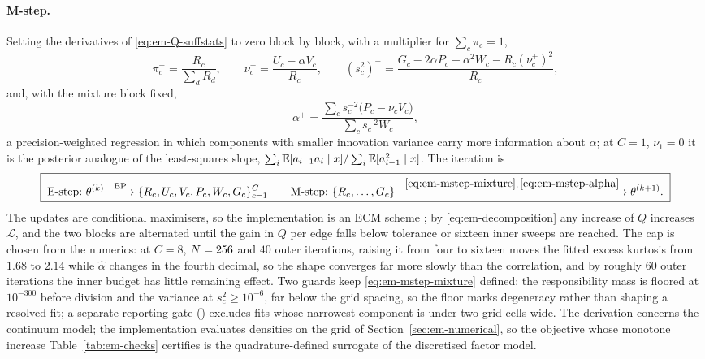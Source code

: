 \paragraph{M-step.} Setting the derivatives of \eqref{eq:em-Q-suffstats} to
zero block by block, with a multiplier for $\sum_c\pi_c = 1$,
\begin{equation}
  \boxed{\;
  \pi_c^{+} = \frac{R_c}{\sum_d R_d},
  \qquad
  \nu_c^{+} = \frac{U_c-\alpha V_c}{R_c},
  \qquad
  (s_c^2)^{+} = \frac{G_c-2\alpha P_c+\alpha^2W_c - R_c(\nu_c^{+})^2}{R_c},
  \;}
  \label{eq:em-mstep-mixture}
\end{equation}
and, with the mixture block fixed,
\begin{equation}
  \boxed{\;
  \alpha^{+}
  = \frac{\sum_c s_c^{-2}\big(P_c-\nu_cV_c\big)}{\sum_c s_c^{-2}W_c},
  \;}
  \label{eq:em-mstep-alpha}
\end{equation}
a precision-weighted regression in which components with smaller innovation
variance carry more information about $\alpha$; at $C = 1$, $\nu_1 = 0$ it is
the posterior analogue of the least-squares slope,
$\sum_i\mathbb{E}[a_{i-1}a_i\mid x]/\sum_i\mathbb{E}[a_{i-1}^2\mid x]$. The iteration is
\begin{equation}
  \boxed{\;
  \text{E-step:}\ \theta^{(k)} \xrightarrow{\ \mathrm{BP}\ }
  \{R_c,U_c,V_c,P_c,W_c,G_c\}_{c=1}^{C}
  \qquad
  \text{M-step:}\ \{R_c,\dots,G_c\} \xrightarrow{\ \eqref{eq:em-mstep-mixture},\,\eqref{eq:em-mstep-alpha}\ }
  \theta^{(k+1)} .
  \;}
  \label{eq:em-summary}
\end{equation}
The updates are conditional maximisers, so the implementation is an ECM
scheme \citep{meng1993maximum}; by \eqref{eq:em-decomposition} any increase
of $Q$ increases $\mathcal L$, and the two blocks are alternated until the
gain in $Q$ per edge falls below tolerance or sixteen inner sweeps are
reached. The cap is chosen from the numerics: at
$C = 8$, $N = 256$ and $40$ outer iterations, raising it from four to
sixteen moves the fitted excess kurtosis from $1.68$ to $2.14$ while
$\widehat\alpha$ changes in the fourth decimal, so the shape converges far
more slowly than the correlation, and by roughly $60$ outer iterations the
inner budget has little remaining effect. Two guards keep
\eqref{eq:em-mstep-mixture} defined: the responsibility mass is floored at
$10^{-300}$ before division and the variance at $s_c^2 \ge 10^{-6}$, far
below the grid spacing, so the floor marks degeneracy rather than shaping a
resolved fit; a separate reporting gate (\provenanceappendix) excludes fits
whose narrowest component is under two grid cells wide. The derivation
concerns the continuum model; the implementation evaluates densities on the
grid of Section~\ref{sec:em-numerical}, so the objective whose monotone
increase Table~\ref{tab:em-checks} certifies is the quadrature-defined
surrogate of the discretised factor model.

